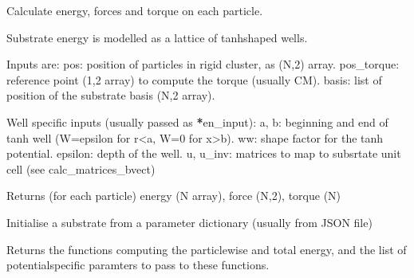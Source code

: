 \documentclass[letterpaper,10pt,english]{sphinxmanual}
\begin{document}

\begin{fulllineitems}
\label{\detokenize{tool_create_substrate:tool_create_substrate.particle_en_tanh}}
\pysigstartsignatures
{}
\pysigstopsignatures
\sphinxAtStartPar
Calculate energy, forces and torque on each particle.

\sphinxAtStartPar
Substrate energy is modelled as a lattice of tanh\sphinxhyphen{}shaped wells.

\sphinxAtStartPar
Inputs are:
\sphinxhyphen{} pos: position of particles in rigid cluster, as (N,2) array.
\sphinxhyphen{} pos\_torque: reference point (1,2 array) to compute the torque (usually CM).
\sphinxhyphen{} basis: list of position of the substrate basis (N,2 array).

\sphinxAtStartPar
Well specific inputs (usually passed as {\color{red}\bfseries{}*}en\_input):
\sphinxhyphen{} a, b: beginning and end of tanh well (W=\sphinxhyphen{}epsilon for r\textless{}a, W=0 for x\textgreater{}b).
\sphinxhyphen{} ww: shape factor for the tanh potential.
\sphinxhyphen{} epsilon: depth of the well.
\sphinxhyphen{} u, u\_inv: matrices to map to subsrtate unit cell (see calc\_matrices\_bvect)

\sphinxAtStartPar
Returns (for each particle) energy (N array), force (N,2), torque (N)

\end{fulllineitems}


\begin{fulllineitems}
\label{\detokenize{tool_create_substrate:tool_create_substrate.substrate_from_params}}
\pysigstartsignatures
{}
\pysigstopsignatures
\sphinxAtStartPar
Initialise a substrate from a parameter dictionary (usually from JSON file)

\sphinxAtStartPar
Returns the functions computing the particle\sphinxhyphen{}wise and total energy, and the list of potential\sphinxhyphen{}specific paramters to pass to these functions.

\end{fulllineitems}
\end{document}
